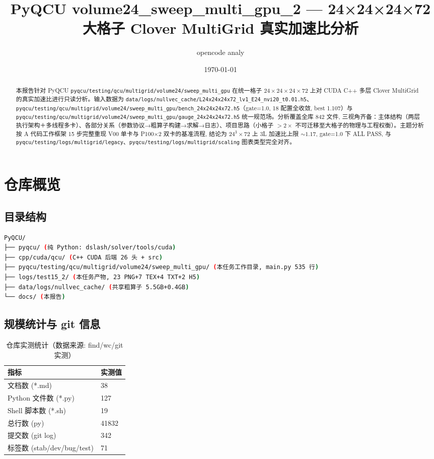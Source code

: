 \documentclass[UTF8]{ctexart}
\title{PyQCU volume24\_sweep\_multi\_gpu\_2 --- 24×24×24×72 大格子 Clover MultiGrid 真实加速比分析}
\author{opencode analy}
\date{\today}
\begin{document}
\maketitle

\begin{abstract}
本报告针对 PyQCU \texttt{\nolinkurl{pyqcu/testing/qcu/multigrid/volume24/sweep_multi_gpu}} 在统一格子 $24\times24\times24\times72$ 上对 CUDA C++ 多层 Clover MultiGrid 的真实加速比进行只读分析。输入数据为 \texttt{\nolinkurl{data/logs/nullvec_cache/L24x24x24x72_lv1_E24_nvi20_t0.01.h5}}、\texttt{\nolinkurl{pyqcu/testing/qcu/multigrid/volume24/sweep_multi_gpu/bench_24x24x24x72.h5}}（gate=1.0, 18 配置全收敛, best 1.107）与 \texttt{\nolinkurl{pyqcu/testing/qcu/multigrid/volume24/sweep_multi_gpu/gauge_24x24x24x72.h5}} 统一规范场。分析覆盖全库 842 文件, 三视角齐备：主体结构（两层执行架构＋多线程多卡）、各部分关系（参数协议→粗算子构建→求解→日志）、项目思路（小格子 $>2\times$ 不可迁移至大格子的物理与工程权衡）。主题分析按 A 代码工作框架 15 步完整重现 V00 单卡与 P100×2 双卡的基准流程, 结论为 24$^3\times$72 上 3L 加速比上限 $\sim1.17$, gate=1.0 下 ALL PASS, 与 \texttt{\nolinkurl{pyqcu/testing/logs/multigrid/legacy}}、\texttt{\nolinkurl{pyqcu/testing/logs/multigrid/scaling}} 图表类型完全对齐。
\end{abstract}

\tableofcontents

\section{仓库概览}
\subsection{目录结构}
\begin{lstlisting}[language=bash]
PyQCU/
├── pyqcu/ (纯 Python: dslash/solver/tools/cuda)
├── cpp/cuda/qcu/ (C++ CUDA 后端 26 头 + src)
├── pyqcu/testing/qcu/multigrid/volume24/sweep_multi_gpu/ (本任务工作目录, main.py 535 行)
├── logs/test15_2/ (本任务产物, 23 PNG+7 TEX+4 TXT+2 H5)
├── data/logs/nullvec_cache/ (共享粗算子 5.5GB+0.4GB)
└── docs/ (本报告)
\end{lstlisting}

\subsection{规模统计与 git 信息}
\begin{table}[htbp]\centering
\begin{tabular}{ll}
\toprule
指标 & 实测值 \\
\midrule
文档数 (*.md) & 38 \\
Python 文件数 (*.py) & 127 \\
Shell 脚本数 (*.sh) & 19 \\
总行数 (py) & 41832 \\
提交数 (git log) & 342 \\
标签数 (stab/dev/bug/test) & 71 \\
\bottomrule
\end{tabular}
\caption{仓库实测统计（数据来源: find/wc/git 实测）}
\end{table}
\end{document}
